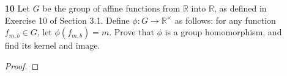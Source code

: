 \documentclass[paper=usletter, fontsize=12pt]{article}
\begin{document}
\begin{itemize}
\begin{enumerate}
\begin{enumerate}
\begin{proof}
                    For $\phi$ to be homomorphic, the identity element of $\gl_2(\mathbb{R})=e_1=\left[\begin{tabular}{LL}
                            1 & 0 \\
                            0 & 1
                    \end{tabular}\right]$ must be mapped to the identity element of $\mathbb{R}^{\times}=e_2=1$\\
                    But
                    \begin{align*}
                        \phi\left(\left[\begin{tabular}{LL}
                            1 & 0 \\
                            0 & 1
                        \end{tabular}\right]\right) &= 1 \times 0\\
                        &= 0 \\
                        & \neq e_2=1
                    \end{align*}
                    Therefore, $\phi$ is not a homomorphism \qedhere

                \end{proof}

            \end{enumerate}

            \item[\textbf{10}] Let $G$ be the group of affine functions from
            $\mathbb{R}$ into $\mathbb{R}$, as defined in Exercise 10 of
            Section 3.1. Define $\phi:G \rightarrow \mathbb{R}^{\times}$ as
            follows: for any function $f_{m,b} \in G$, let $\phi(f_{m,b})=m$.
            Prove that $\phi$ is a group homomorphism, and find its kernel and
            image.
            \begin{proof}


\end{proof}
\end{enumerate}
\end{itemize}
\end{document}
